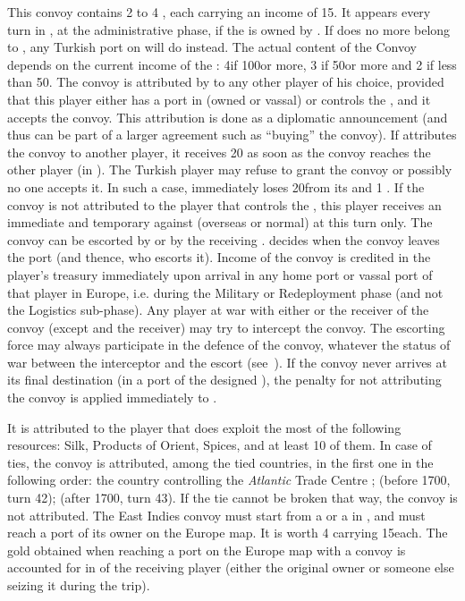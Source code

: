 \label{chIncomes:Levant Convoy} This
convoy contains 2 to 4 \NTD, each carrying an income of 15\ducats.  It appears
every turn in , at the administrative phase, if the  is owned by \TUR.
\bparag If  does no more belong to \TUR, any Turkish port on
 will do instead.
\bparag The actual content of the Convoy depends on the current income of the
: 4\NTD if 100\ducats or more, 3 \NTD if 50\ducats or more
and 2 \NTD if less than 50\ducats.
\bparag The convoy is attributed by \TUR to any other player of his choice,
provided that this player either has a port in  (owned or
vassal) or controls the , and it accepts the convoy. This
attribution is done as a diplomatic announcement (and thus can be part of a
larger agreement such as ``buying'' the convoy).
\bparag If \TUR attributes the convoy to another player, it receives 20\ducats
as soon as the convoy reaches the other player (in ).
\bparag The Turkish player may refuse to grant the convoy or possibly no one
accepts it. In such a case, \TUR immediately loses 20\ducats from its \RT and
1 \STAB.
\bparag If the convoy is not attributed to the player that controls the
, this player receives an immediate and temporary \CB
against \TUR (overseas or normal) at this turn only.
\bparag The convoy can be escorted by \TUR or by the receiving \MAJ. \TUR
decides when the convoy leaves the port (and thence, who escorts it).
\bparag Income of the convoy is credited in the player's treasury immediately
upon arrival in any home port or vassal port of that player in Europe,
i.e. during the Military or Redeployment phase (and not the Logistics
sub-phase).
\bparag Any player at war with either \TUR or the receiver of the convoy
(except \TUR and the receiver) may try to intercept the convoy. The escorting
force may always participate in the defence of the convoy, whatever the status
of war between the interceptor and the escort
(see~).
\bparag If the convoy never arrives at its final destination (in a port of the
designed \MAJ), the penalty for not attributing the convoy is applied
immediately to \TUR.

 It is attributed to the player that does exploit
the most of the following resources: Silk, Products of Orient, Spices, and at
least 10 of them.
\bparag In case of ties, the convoy is attributed, among the tied countries,
in the first one in the following order: the country controlling
the \emph{Atlantic} Trade Centre ; \HOL (before 1700, turn 42); \ANG (after
1700, turn 43). If the tie cannot be broken that way, the convoy is not
attributed.
\bparag The East Indies convoy must start from a \COL\faceplus or a
\TP\faceplus in , and must reach a port of its owner on the
Europe map. It is worth 4 \NTD carrying 15\ducats each.
\bparag The gold obtained when reaching a port on the Europe map with a convoy
is accounted for in  of the receiving
player (either the original owner or someone else seizing it during the trip).

